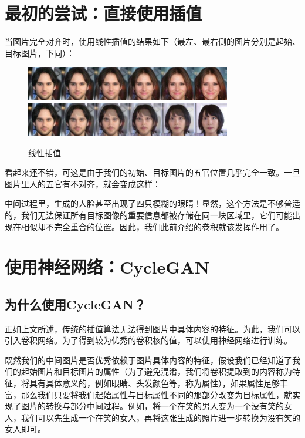 \documentclass[UTF8,a4paper，12pt]{article}
\theoremstyle{theorem}
\theoremstyle{definition}
\begin{document}
\section{最初的尝试：直接使用插值}

当图片完全对齐时，使用线性插值的结果如下（最左、最右侧的图片分别是起始、目标图片，下同）：
\begin{figure}[htbp]
	\centering
	\includegraphics[width=0.8\textwidth]{assets/07}
	\includegraphics[width=0.8\textwidth]{assets/08}
	\caption{线性插值}
\end{figure}

看起来还不错，可这是由于我们的初始、目标图片的五官位置几乎完全一致。一旦图片里人的五官有不对齐，就会变成这样：

中间过程里，生成的人脸甚至出现了四只模糊的眼睛！显然，这个方法是不够普适的，我们无法保证所有目标图像的重要信息都被存储在同一块区域里，它们可能出现在相似却不完全重合的位置。因此，我们此前介绍的卷积就该发挥作用了。

\section{使用神经网络：CycleGAN}

\subsection{为什么使用CycleGAN？}

正如上文所述，传统的插值算法无法得到图片中具体内容的特征。为此，我们可以引入卷积网络。为了得到较为优秀的卷积核的值，可以使用神经网络进行训练。

既然我们的中间图片是否优秀依赖于图片具体内容的特征，假设我们已经知道了我们的起始图片和目标图片的属性（为了避免混淆，我们将卷积提取到的内容称为特征，将具有具体意义的，例如眼睛、头发颜色等，称为属性），如果属性足够丰富，那么我们只要将我们起始属性与目标属性不同的那部分改变为目标属性，就实现了图片的转换与部分中间过程。例如，将一个在笑的男人变为一个没有笑的女人，我们可以先生成一个在笑的女人，再将这张生成的照片进一步转换为没有笑的女人即可。
\end{document}
